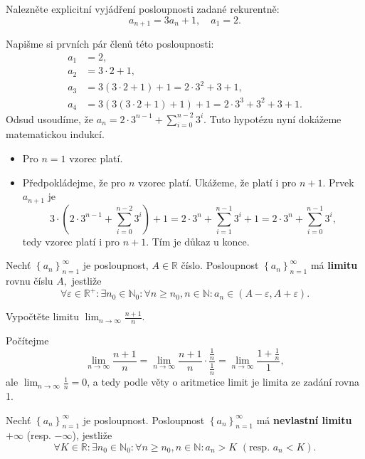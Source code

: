 \begin{priklad}
Nalezněte explicitní vyjádření posloupnosti zadané rekurentně: $$a_{n+1}=3a_n+1, \quad a_1=2.$$
\end{priklad}

\begin{reseni}
Napišme si prvních pár členů této posloupnosti:
\begin{align*}
	a_1 &= 2, \\
	a_2 &= 3 \cdot 2 + 1, \\
	a_3 &= 3(3\cdot 2 + 1)+1 = 2 \cdot 3^2 + 3+1, \\
	a_4 &= 3(3 (3\cdot 2 + 1)+1)+1 = 2\cdot 3^3 + 3^2+3+1.
\end{align*}
Odsud usoudíme, že $a_n = 2\cdot 3^{n-1}+\sum_{i=0}^{n-2}3^i$. Tuto hypotézu nyní dokážeme matematickou indukcí.
\begin{itemize}
	\item Pro $n = 1$ vzorec platí.
	\item Předpokládejme, že pro $n$ vzorec platí. Ukážeme, že platí i pro $n+1$. Prvek $a_{n+1}$ je
	$$
	    3\cdot \left( 2\cdot 3^{n-1}+\sum_{i=0}^{n-2}3^i \right ) +1 = 2\cdot 3^n + \sum_{i=1}^{n-1} 3^i + 1 = 2\cdot 3^n + \sum_{i=0}^{n-1} 3^i,
	$$
	tedy vzorec platí i pro $n+1$. Tím je důkaz u konce.
\end{itemize}
\end{reseni}

\begin{definition}
Nechť $\left \{ a_n \right \}_{n=1}^\infty $ je posloupnost, $A\in \mathbb R$ číslo.
Posloupnost $\left \{ a_n \right \}_{n=1}^\infty $ má \textbf{limitu} rovnu číslu
$A,$ jestliže
$$\forall \varepsilon \in \mathbb R^+\colon \exists n_0 \in \mathbb N_0\colon \forall n \geq n_0,n \in \mathbb N\colon a_n\in(A-\varepsilon, A+\varepsilon).$$
\end{definition}

\begin{priklad}
Vypočtěte limitu $\lim_{n\to\infty}\frac{n+1}{n}.$
\end{priklad}

\begin{reseni}
Počítejme
$$
    \lim_{n\to\infty}\frac{n+1}{n} = \lim_{n \to \infty} \frac{n+1}{n} \cdot \frac{\frac{1}{n }}{\frac{1}{n}} = \lim_{n \to \infty} \frac{1+\frac{1}{n }}{1},
$$
ale $\lim_{n \to \infty} \frac{1}{n} = 0$, a tedy podle věty o aritmetice limit je limita ze zadání rovna 1.
\end{reseni}

\begin{definition}
Nechť $\left \{ a_n \right \}_{n=1}^\infty $ je posloupnost.
Posloupnost $\left \{ a_n \right \}_{n=1}^\infty $ má \textbf{nevlastní limitu}
$+\infty$ (resp. $-\infty$), jestliže
$$\forall K \in \mathbb R\colon \exists n_0 \in \mathbb N_0\colon \forall n \geq n_0, n\in \mathbb N\colon a_n>K \,\, (\textrm{resp. } a_n<K).$$
\end{definition}

